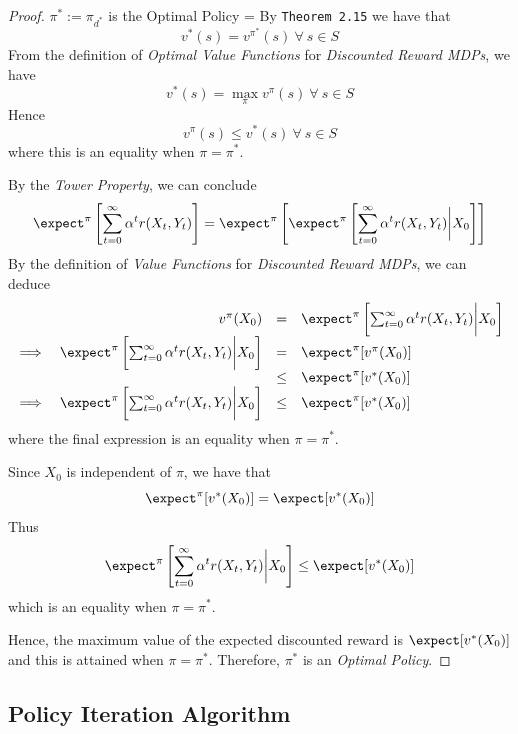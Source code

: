 \documentclass[11pt,a4paper]{article}
\begin{document}
  \begin{proof}{$\pi^*:=\pi_{d^*}$ is the Optimal Policy}
    \everymath={\displaystyle}
    By \texttt{Theorem 2.15}  we have that
    \[ v^*(s)=v^{\pi^*}(s)\ \forall\ s\in S \]
    From the definition of \textit{Optimal Value Functions} for \textit{Discounted Reward MDPs}, we have
    \[ v^*(s)=\max_\pi v^\pi(s)\ \forall\ s\in S \]
    Hence
    \[ v^\pi(s)\leq v^*(s)\ \forall\ s\in S \]
    where this is an equality when $\pi=\pi^*$.
    \par By the \textit{Tower Property}, we can conclude
    \[ \expect^\pi\left[\sum_{t=0}^\infty\alpha^tr(X_t,Y_t)\right]=\expect^\pi\left[\expect^\pi\left[\sum_{t=0}^\infty\alpha^tr(X_t,Y_t)\bigg|X_0\right]\right] \]
    By the definition of \textit{Value Functions} for \textit{Discounted Reward MDPs}, we can deduce
    \[\begin{array}{rrcl}
      &v^\pi(X_0)&=&\expect^\pi\left[\sum_{t=0}^\infty\alpha^tr(X_t,Y_t)\bigg|X_0\right]\\
      \implies&\expect^\pi\left[\sum_{t=0}^\infty\alpha^tr(X_t,Y_t)\bigg|X_0\right]&=&\expect^\pi[v^\pi(X_0)]\\
      &&\leq&\expect^\pi[v^*(X_0)]\\
      \implies&\expect^\pi\left[\sum_{t=0}^\infty\alpha^tr(X_t,Y_t)\bigg|X_0\right]&\leq&\expect^\pi[v^*(X_0)]
    \end{array}\]
    where the final expression is an equality when $\pi=\pi^*$.
    \par Since $X_0$ is independent of $\pi$, we have that
    \[ \expect^\pi[v^*(X_0)]=\expect[v^*(X_0)] \]
    Thus
    \[ \expect^\pi\left[\sum_{t=0}^\infty\alpha^tr(X_t,Y_t)\bigg|X_0\right]\leq\expect[v^*(X_0)] \]
    which is an equality when $\pi=\pi^*$.
    \par Hence, the maximum value of the expected discounted reward is $\expect[v^*(X_0)]$ and this is attained when $\pi=\pi^*$. Therefore, $\pi^*$ is an \textit{Optimal Policy}.\proved
  \end{proof}

\subsection*{Policy Iteration Algorithm}
\end{document}
